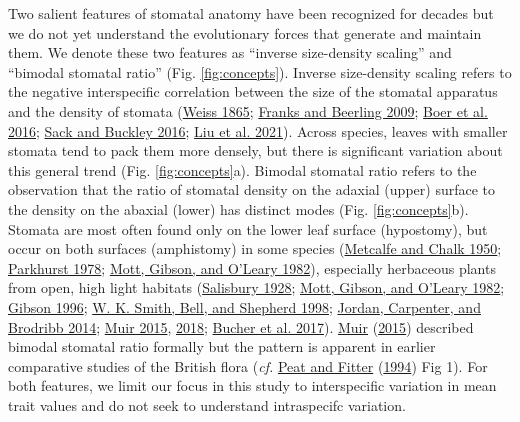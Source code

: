\documentclass[
  10pt,
]{article}
\begin{document}
Two salient features of stomatal anatomy have been recognized for decades but we do not yet understand the evolutionary forces that generate and maintain them. We denote these two features as ``inverse size-density scaling'' and ``bimodal stomatal ratio'' (Fig. \ref{fig:concepts}). Inverse size-density scaling refers to the negative interspecific correlation between the size of the stomatal apparatus and the density of stomata (\protect\hyperlink{ref-weiss_untersuchungen_1865}{Weiss 1865}; \protect\hyperlink{ref-franks_maximum_2009}{Franks and Beerling 2009}; \protect\hyperlink{ref-de_boer_optimal_2016}{Boer et al. 2016}; \protect\hyperlink{ref-sack_developmental_2016}{Sack and Buckley 2016}; \protect\hyperlink{ref-liu_scaling_2021}{Liu et al. 2021}). Across species, leaves with smaller stomata tend to pack them more densely, but there is significant variation about this general trend (Fig. \ref{fig:concepts}a). Bimodal stomatal ratio refers to the observation that the ratio of stomatal density on the adaxial (upper) surface to the density on the abaxial (lower) has distinct modes (Fig. \ref{fig:concepts}b). Stomata are most often found only on the lower leaf surface (hypostomy), but occur on both surfaces (amphistomy) in some species (\protect\hyperlink{ref-metcalfe_anatomy_1950}{Metcalfe and Chalk 1950}; \protect\hyperlink{ref-parkhurst_adaptive_1978}{Parkhurst 1978}; \protect\hyperlink{ref-mott_adaptive_1982}{Mott, Gibson, and O'Leary 1982}), especially herbaceous plants from open, high light habitats (\protect\hyperlink{ref-salisbury_i_1928}{Salisbury 1928}; \protect\hyperlink{ref-mott_adaptive_1982}{Mott, Gibson, and O'Leary 1982}; \protect\hyperlink{ref-gibson_structure-function_1996}{Gibson 1996}; \protect\hyperlink{ref-smith_associations_1998}{W. K. Smith, Bell, and Shepherd 1998}; \protect\hyperlink{ref-jordan_using_2014}{Jordan, Carpenter, and Brodribb 2014}; \protect\hyperlink{ref-muir_making_2015}{Muir 2015}, \protect\hyperlink{ref-muir_light_2018}{2018}; \protect\hyperlink{ref-bucher_stomatal_2017}{Bucher et al. 2017}). \protect\hyperlink{ref-muir_making_2015}{Muir} (\protect\hyperlink{ref-muir_making_2015}{2015}) described bimodal stomatal ratio formally but the pattern is apparent in earlier comparative studies of the British flora (\emph{cf.} \protect\hyperlink{ref-peat_comparative_1994}{Peat and Fitter} (\protect\hyperlink{ref-peat_comparative_1994}{1994}) Fig 1). For both features, we limit our focus in this study to interspecific variation in mean trait values and do not seek to understand intraspecifc variation.
\end{document}
